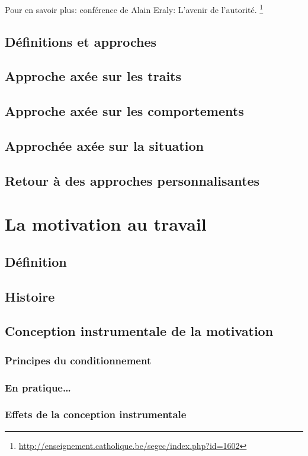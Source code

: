 \documentclass[12pt]{article}
\begin{document}
	Pour en savoir plus: conférence de Alain Eraly: L'avenir de l'autorité. \footnote{\url{http://enseignement.catholique.be/segec/index.php?id=1602}}
	
	\subsection{Définitions et approches}
	
	
	\subsection{Approche axée sur les traits}
	\subsection{Approche axée sur les comportements}
	\subsection{Approchée axée sur la situation}
	\subsection{Retour à des approches personnalisantes}
	

\section{La motivation au travail}
	\subsection{Définition}
	\subsection{Histoire}
	\subsection{Conception instrumentale de la motivation}
		\subsubsection{Principes du conditionnement}
		\subsubsection{En pratique…}
		\subsubsection{Effets de la conception instrumentale}
\end{document}
